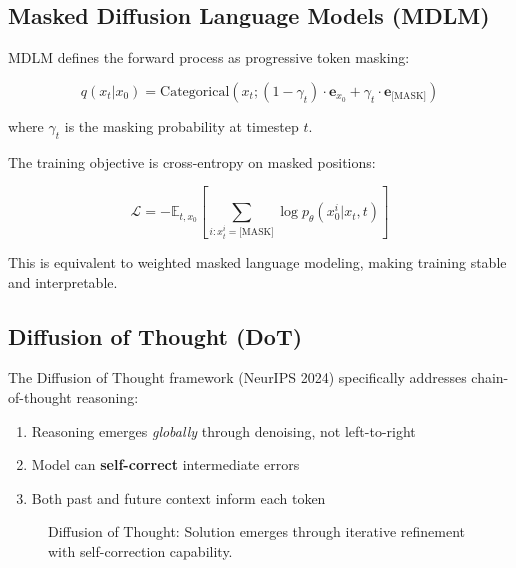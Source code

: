 \documentclass[11pt,a4paper]{article}
\begin{document}
\subsection{Masked Diffusion Language Models (MDLM)}

MDLM defines the forward process as progressive token masking:

\begin{equation}
    q(x_t | x_0) = \text{Categorical}\left( x_t; (1-\gamma_t) \cdot \mathbf{e}_{x_0} + \gamma_t \cdot \mathbf{e}_{\text{[MASK]}} \right)
\end{equation}

where $\gamma_t$ is the masking probability at timestep $t$.

The training objective is cross-entropy on masked positions:

\begin{equation}
    \mathcal{L} = -\mathbb{E}_{t, x_0}\left[ \sum_{i: x_t^i = \text{[MASK]}} \log p_\theta(x_0^i | x_t, t) \right]
\end{equation}

This is equivalent to weighted masked language modeling, making training stable and interpretable.

\subsection{Diffusion of Thought (DoT)}

The Diffusion of Thought framework (NeurIPS 2024) specifically addresses chain-of-thought reasoning:

\begin{enumerate}
    \item Reasoning emerges \textit{globally} through denoising, not left-to-right
    \item Model can \textbf{self-correct} intermediate errors
    \item Both past and future context inform each token
\end{enumerate}

\begin{figure}[H]
\centering
{}
\caption{Diffusion of Thought: Solution emerges through iterative refinement with self-correction capability.}
\label{fig:dot}
\end{figure}
\end{document}
